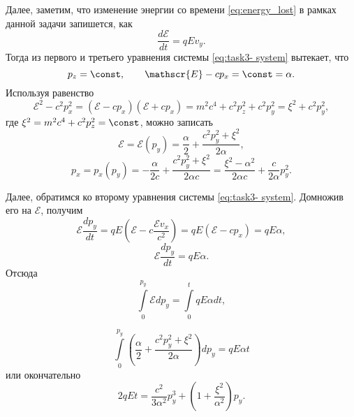 Далее, заметим, что изменение энергии со времени \eqref{eq:energy_lost} в рамках данной задачи запишется, как
\begin{equation*}
\frac{d\mathscr{E}}{dt} = q E v_y.
\end{equation*}
Тогда из первого и третьего уравнения системы \eqref{eq:task3- system} вытекает, что 
\begin{equation*}
p_z = \const, \qquad \mathscr{E} - c p_x = \const = \alpha.
\end{equation*}
Используя равенство 
\begin{equation*}
\mathscr{E}^2 - c^2p_x^2 = \left( \mathscr{E} - c p_x \right)\left( \mathscr{E} + c p_x \right) = m^2 c^4 + c^2 p_z^2 + c^2 p_y^2 = \xi^2 + c^2 p_y^2,
\end{equation*}
где $\xi^2 = m^2 c^4 + c^2 p_z^2 = \const$, можно записать
\begin{equation}
\mathscr{E}= \mathscr{E} (p_y) = \frac{\alpha}{2} + \frac{c^2 p^2_y + \xi^2}{2 \alpha},
\label{eq:raz}
\end{equation}
\begin{equation}
p_x =p_x (p_y) = - \frac{\alpha}{2c} + \frac{c^2 p_y^2 + \xi^2}{2\alpha c} = \frac{\xi^2 - \alpha^2}{2 \alpha c} + \frac{c}{2 \alpha} p_y^2.
\label{eq:dva}
\end{equation}


Далее, обратимся ко второму уравнения системы \eqref{eq:task3- system}. Домножив его на $\mathscr{E}$, получим
\begin{equation*}
\mathscr{E} \frac{d p_y}{dt} = qE \left( \mathscr{E} - c \frac{\mathscr{E} v_x}{c^2} \right) = q E \left(  \mathscr{E} - c p_x  \right) = q E \alpha,
\end{equation*}
\begin{equation}
\mathscr{E} \frac{d p_y}{dt} = q E \alpha.
\label{eq:dt_and_dpy}
\end{equation}
Отсюда
\begin{equation*}
\int \limits_{0}^{p_y} \mathscr{E} dp_y = \int \limits_0^t qE \alpha dt,
\end{equation*}

\begin{equation*}
\int \limits_0^{p_y} \left(\frac{\alpha}{2} + \frac{c^2 p^2_y + \xi^2}{2 \alpha}\right) dp_y =  qE \alpha t
\end{equation*}
или окончательно
\begin{equation}
2qEt = \frac{c^2}{3 \alpha^2} p_y^3  + \left(  1 + \frac{\xi^2}{\alpha^2}  \right) p_y.
\label{eq:ans0}
\end{equation}

